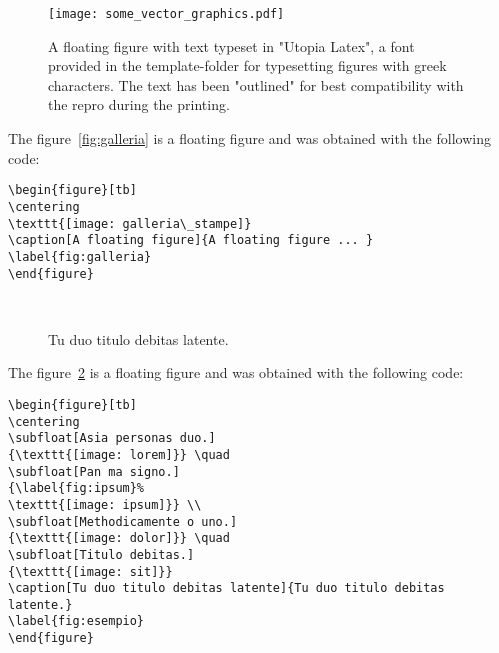 \begin{figure}[tb] 
\centering 
\texttt{[image: some\_vector\_graphics.pdf]} 
\caption[A floating figure]{A floating figure with text typeset in "Utopia Latex", a font provided in the template-folder for typesetting figures with greek characters. The text has been "outlined" for best compatibility with the repro during the printing.}
\label{fig:vector_graphics} 
\end{figure}


The figure~\ref{fig:galleria} is a floating figure and was obtained with the following code:
\begin{lstlisting}
\begin{figure}[tb] 
\centering 
\texttt{[image: galleria\_stampe]} 
\caption[A floating figure]{A floating figure ... }
\label{fig:galleria} 
\end{figure}
\end{lstlisting}



\begin{figure}[tb]
\centering

 \quad
{} \\
 \quad
{}
\caption[Tu duo titulo debitas latente]{Tu duo titulo debitas
latente.}
\label{fig:esempio}
\end{figure}

The figure~\ref{fig:esempio} is a floating figure and was obtained with the following code:
\begin{lstlisting}
\begin{figure}[tb]
\centering
\subfloat[Asia personas duo.]
{\texttt{[image: lorem]}} \quad
\subfloat[Pan ma signo.]
{\label{fig:ipsum}%
\texttt{[image: ipsum]}} \\
\subfloat[Methodicamente o uno.]
{\texttt{[image: dolor]}} \quad
\subfloat[Titulo debitas.]
{\texttt{[image: sit]}}
\caption[Tu duo titulo debitas latente]{Tu duo titulo debitas latente.}
\label{fig:esempio}
\end{figure}
\end{lstlisting}


\lipsum[3-8]
